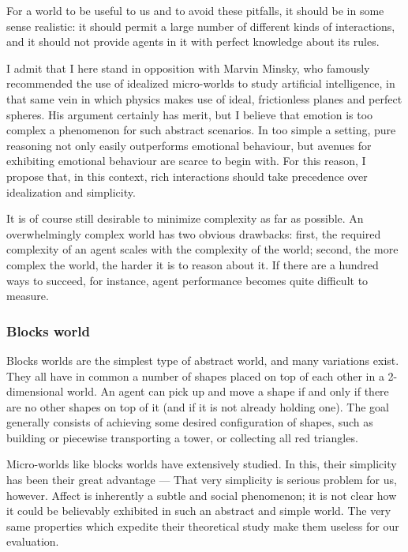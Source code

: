 For a world to be useful to us and to avoid these pitfalls, it should be in some sense realistic: it should permit a large number of different kinds of interactions, and it should not provide agents in it with perfect knowledge about its rules. 

I admit that I here stand in opposition with Marvin Minsky, who famously recommended the use of idealized micro-worlds to study artificial intelligence, in that same vein in which physics makes use of ideal, frictionless planes and perfect spheres. His argument certainly has merit, but I believe that emotion is too complex a phenomenon for such abstract scenarios. In too simple a setting, pure reasoning not only easily outperforms emotional behaviour, but avenues for exhibiting emotional behaviour are scarce to begin with. For this reason, I propose that, in this context, rich interactions should take precedence over idealization and simplicity.

It is of course still desirable to minimize complexity as far as possible. An overwhelmingly complex world has two obvious drawbacks: first, the required complexity of an agent scales with the complexity of the world; second, the more complex the world, the harder it is to reason about it. If there are a hundred ways to succeed, for instance, agent performance becomes quite difficult to measure.

\subsubsection{Blocks world}

Blocks worlds are the simplest type of abstract world, and many variations exist. They all have in common a number of shapes placed on top of each other in a 2-dimensional world. An agent can pick up and move a shape if and only if there are no other shapes on top of it (and if it is not already holding one). The goal generally consists of achieving some desired configuration of shapes, such as building or piecewise transporting a tower, or collecting all red triangles. 

Micro-worlds like blocks worlds have extensively studied. In this, their simplicity has been their great advantage --- That very simplicity is serious problem for us, however. Affect is inherently a subtle and social phenomenon; it is not clear how it could be believably exhibited in such an abstract and simple world. The very same properties which expedite their theoretical study make them useless for our evaluation.

